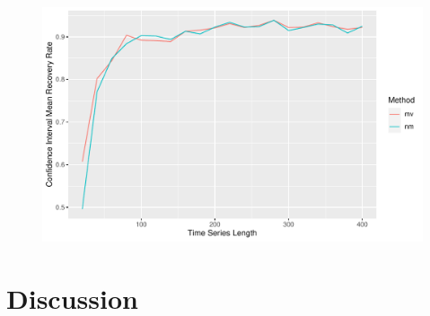 \documentclass[12pt, letterpaper, titlepage]{article}
\begin{document}
\begin{figure}[tbp]
  \centering
  \includegraphics[width=\textwidth]{constant_0.2}
  \caption{}
  \label{fig:constant_0.2}
\end{figure}

\label{sec:results}




\section{Discussion}
\label{sec:discuss}





\end{document}
